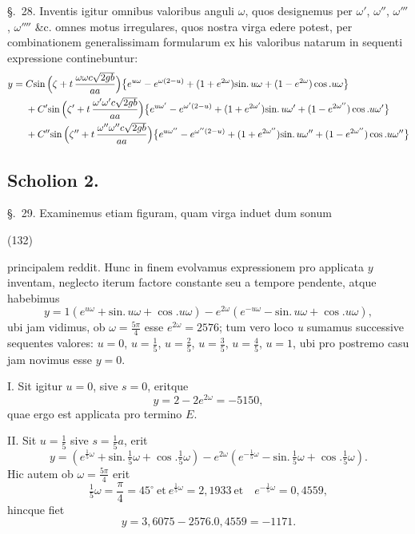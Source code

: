 \documentclass[11pt,a4paper]{article}
\begin{document}
§.~28. Inventis igitur omnibus valoribus anguli $\omega$, quos designemus per
$\omega'$, $\omega''$, $\omega'''$, $\omega''''$ \&c. omnes motus irregulares, quos
nostra virga edere potest, per combinationem generalissimam formularum ex his
valoribus natarum in sequenti expressione continebuntur:
\begin{align}
y ={}& C\text{sin}\,\Bigl(\zeta + t\,\frac{\omega\omega c\sqrt{2gb}}{aa}\Bigr)\bigl\{e^{u\omega} - e^{\omega(2-u)} + (1 + e^{2\omega})\text{sin.}\,u\omega + (1 - e^{2\omega})\cos.u\omega\bigr\}\\
&+ C'\text{sin}\,\Bigl(\zeta' + t\,\frac{\omega'\omega'c\sqrt{2gb}}{aa}\Bigr)\bigl\{e^{u\omega'} - e^{\omega'(2-u)} + (1 + e^{2\omega'})\text{sin.}\,u\omega' + (1 - e^{2\omega''})\cos.u\omega'\bigr\}\\
&+ C''\text{sin}\,\Bigl(\zeta'' + t\,\frac{\omega''\omega''c\sqrt{2gb}}{aa}\Bigr)\bigl\{e^{u\omega''} - e^{\omega''(2-u)} + (1 + e^{2\omega''})\text{sin.}\,u\omega'' + (1 - e^{2\omega''})\cos.u\omega''\bigr\}
\end{align}

\subsection{Scholion 2.}

§.~29. Examinemus etiam figuram, quam virga induet dum sonum

(132)

principalem  reddit. Hunc in finem evolvamus expressionem pro
applicata $y$ inventam, neglecto iterum factore constante seu a tempore pendente,
atque habebimus
\[
y = 1(e^{u\omega} + \text{sin.}\,u\omega + \cos.u\omega) - e^{2\omega}(e^{-u\omega} - \text{sin.}\,u\omega + \cos.u\omega),
\]
ubi jam vidimus, ob $\omega = \frac{5\pi}{4}$ esse $e^{2\omega} = 2576$; tum vero loco
\emph{u} sumamus successive sequentes valores: $u = 0$, $u = \frac{1}{5}$,
$u = \frac{2}{5}$, $u = \frac{3}{5}$, $u = \frac{4}{5}$, $u = 1$, ubi pro postremo casu
jam novimus esse $y = 0$.

I. Sit igitur $u = 0$, sive $s = 0$, eritque
\[
y = 2 - 2e^{2\omega} = -5150,
\]
quae ergo est applicata pro termino $E$.

II. Sit $u = \frac{1}{5}$ sive $s = \frac{1}{5}a$, erit
\[
y = (e^{\frac{1}{5}\omega} + \text{sin.}\,\tfrac{1}{5}\omega + \cos.\tfrac{1}{5}\omega) - e^{2\omega}(e^{-\frac{1}{5}\omega} - \text{sin.}\,\tfrac{1}{5}\omega + \cos.\tfrac{1}{5}\omega).
\]
Hic autem ob $\omega = \frac{5\pi}{4}$ erit
\[
\tfrac{1}{5}\omega = \frac{\pi}{4} = 45^\circ \ \text{et}\ e^{\frac{1}{5}\omega} = 2{,}1933 \ \text{et}\quad
e^{-\frac{1}{5}\omega} = 0{,}4559,
\]
hincque fiet
\[
y = 3{,}6075 - 2576.0{,}4559 = -1171.
\]
\end{document}
